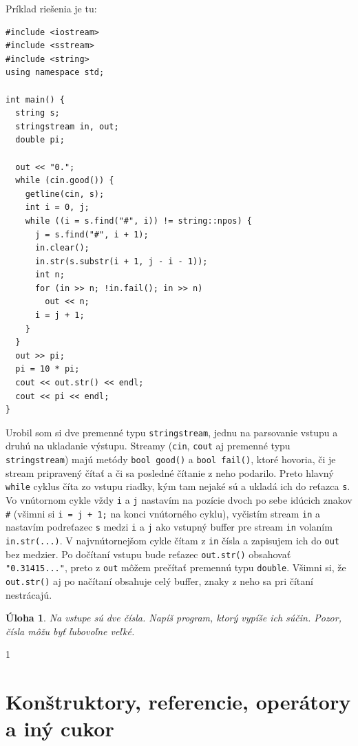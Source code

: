 \documentclass[10pt]{article}
\def\prg{\lstinline}
\newtheorem{uloha}{Úloha}
\def\sectxxi{1} %
\def\sectxxi{0} %
\begin{document}
Príklad riešenia je tu:

\begin{lstlisting}
#include <iostream>
#include <sstream>
#include <string>
using namespace std;

int main() {
  string s;
  stringstream in, out;
  double pi;

  out << "0.";
  while (cin.good()) {
    getline(cin, s);
    int i = 0, j;
    while ((i = s.find("#", i)) != string::npos) {
      j = s.find("#", i + 1);
      in.clear();
      in.str(s.substr(i + 1, j - i - 1));
      int n;
      for (in >> n; !in.fail(); in >> n) 
        out << n;
      i = j + 1;
    }
  }
  out >> pi;
  pi = 10 * pi;
  cout << out.str() << endl;
  cout << pi << endl;
}
\end{lstlisting}

Urobil som si dve premenné typu {\tt stringstream}, jednu na parsovanie vstupu a
druhú na ukladanie výstupu. Streamy (\prg!cin!, \prg!cout! aj premenné typu 
{\tt stringstream}) majú metódy \prg!bool good()! a \prg!bool fail()!, ktoré
hovoria, či je stream pripravený čítať a či sa posledné čítanie z neho podarilo.
Preto hlavný \prg!while! cyklus číta zo vstupu riadky, kým tam nejaké sú
a ukladá ich do reťazca {\tt s}.
Vo vnútornom cykle vždy {\tt i}  a {\tt j} nastavím na pozície 
dvoch po sebe idúcich znakov {\tt\#} (všimni si {\tt i = j + 1;} na konci
vnútorného cyklu), vyčistím stream {\tt in} a nastavím podreťazec
{\tt s} medzi {\tt i} a {\tt j} ako vstupný buffer pre stream {\tt in}
volaním {\tt in.str(...)}. V najvnútornejšom cykle čítam z {\tt in} čísla
a zapisujem ich do {\tt out} bez medzier. Po dočítaní vstupu
bude reťazec {\tt out.str()} obsahovať \prg!"0.31415..."!,
preto z {\tt out} môžem prečítať premennú typu \prg!double!.
Všimni si, že {\tt out.str()} aj po načítaní obsahuje celý buffer, znaky
z neho sa pri čítaní nestrácajú.

\begin{uloha}
  Na vstupe sú dve čísla. Napíš program, ktorý vypíše ich súčin. Pozor, čísla 
  môžu byť ľubovoľne veľké.
\end{uloha}

\fi

\if\sectxxi1
\section{Konštruktory, referencie, operátory a iný cukor}
\label{sect:cukor}
\end{document}
